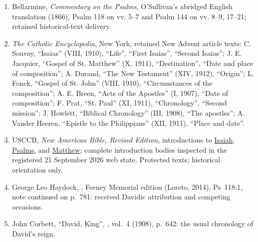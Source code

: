 \begin{enumerate}[leftmargin=1.6em,itemsep=0.25em,parsep=0pt]
\item Bellarmine, \textit{Commentary on the Psalms}, O'Sullivan's abridged English translation (1866), Psalm 118 on vv. 5--7 and Psalm 144 on vv. 8--9, 17--21; retained historical-text delivery.
\item \textit{The Catholic Encyclopedia}, New York, retained New Advent article texts: C. Souvay, ``Isaias'' (VIII, 1910), ``Life'', ``First Isaias'', ``Second Isaias''; J. E. Jacquier, ``Gospel of St. Matthew'' (X, 1911), ``Destination'', ``Date and place of composition''; A. Durand, ``The New Testament'' (XIV, 1912), ``Origin''; L. Fonck, ``Gospel of St. John'' (VIII, 1910), ``Circumstances of the composition''; A. E. Breen, ``Acts of the Apostles'' (I, 1907), ``Date of composition''; F. Prat, ``St. Paul'' (XI, 1911), ``Chronology'', ``Second mission''; J. Howlett, ``Biblical Chronology'' (III, 1908), ``The apostles''; A. Vander Heeren, ``Epistle to the Philippians'' (XII, 1911), ``Place and date''.
\item USCCB, \textit{New American Bible, Revised Edition}, introductions to \href{https://bible.usccb.org/bible/isaiah/0}{Isaiah}, \href{https://bible.usccb.org/bible/psalms/0}{Psalms}, and \href{https://bible.usccb.org/bible/matthew/0}{Matthew}; complete introduction bodies inspected in the registered 21 September 2026 web state. Protected texts; historical orientation only.
\item George Leo Haydock, , Feeney Memorial edition (Loreto, 2014), Ps~118:1, note continued on p.~781: received Davidic attribution and competing occasions.
\item John Corbett, ``David, King'', , vol.~4 (1908), p.~642: the usual chronology of David's reign.
\end{enumerate}
